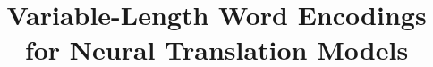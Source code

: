 \documentclass[11pt]{article}
\title{Variable-Length Word Encodings for Neural Translation Models}
\begin{document}
\maketitle
\begin{abstract}

\end{abstract}







\newpage

\end{document}
